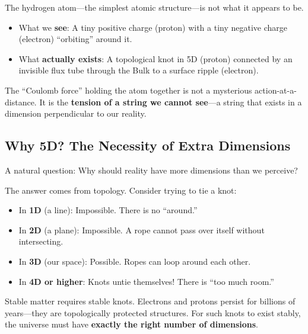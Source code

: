 \begin{tcolorbox}[colback=blue!5,colframe=blue!70,title=\textbf{The Central Insight of This Chapter}]
The hydrogen atom---the simplest atomic structure---is not what it appears to be.

\begin{itemize}
    \item What we \textbf{see}: A tiny positive charge (proton) with a tiny negative charge (electron) ``orbiting'' around it.
    
    \item What \textbf{actually exists}: A topological knot in 5D (proton) connected by an invisible flux tube through the Bulk to a surface ripple (electron).
\end{itemize}

The ``Coulomb force'' holding the atom together is not a mysterious action-at-a-distance. It is the \textbf{tension of a string we cannot see}---a string that exists in a dimension perpendicular to our reality.
\end{tcolorbox}

\subsection{Why 5D? The Necessity of Extra Dimensions}
\label{subsec:why_5d}

A natural question: Why should reality have more dimensions than we perceive?

The answer comes from topology. Consider trying to tie a knot:

\begin{itemize}
    \item In \textbf{1D} (a line): Impossible. There is no ``around.''
    \item In \textbf{2D} (a plane): Impossible. A rope cannot pass over itself without intersecting.
    \item In \textbf{3D} (our space): Possible. Ropes can loop around each other.
    \item In \textbf{4D or higher}: Knots untie themselves! There is ``too much room.''
\end{itemize}

Stable matter requires stable knots. Electrons and protons persist for billions of years---they are topologically protected structures. For such knots to exist stably, the universe must have \textbf{exactly the right number of dimensions}.

